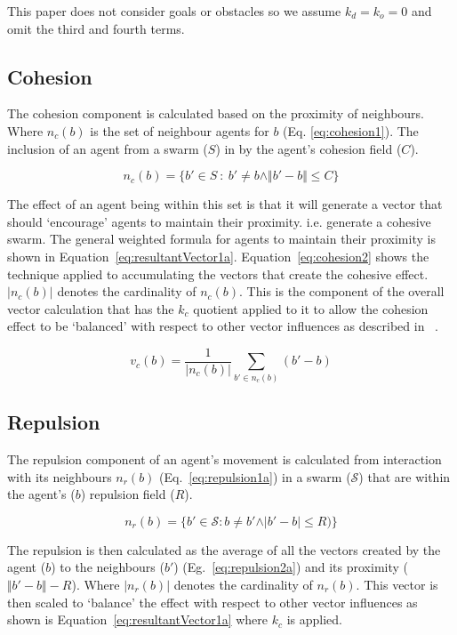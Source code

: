 \documentclass[12pt,a4paper]{IEEEtran}
\newcommand{\magn}[1]{\Vert{#1}\Vert}
\newcommand{\card}[1]{\vert{#1}\vert}
\newcommand{\vbb}[2]{#2-#1}
\newcommand{\kc}{\mathit{k_{c}}}
\newcommand{\kd}{\mathit{k_{d}}}
\newcommand{\ko}{\mathit{k_{o}}}
\newcommand{\rb}{\mathit{R}}
\begin{document}
This paper does not consider goals or obstacles so we assume $\kd = \ko = 0$ and omit the third and fourth terms.

\subsection{Cohesion}\label{cohesion}
The cohesion component is calculated based on the proximity of neighbours. Where $n_c(b)$ is the set of neighbour agents for $b$ (Eq. \ref{eq:cohesion1}). The inclusion of an agent from a swarm ($S$) in by the agent's cohesion field ($C$).

\begin{equation}\label{eq:cohesion1}
n_c(b) = \{b' \in S~:~b' \neq b \land\magn{\vbb{b}{b'}} \leq C\}
\end{equation}

The effect of an agent being within this set is that it will generate a vector that should `encourage' agents to maintain their proximity. i.e. generate a cohesive swarm. The general weighted formula for agents to maintain their proximity is shown in Equation~\ref{eq:resultantVector1a}. Equation~\ref{eq:cohesion2} shows the technique applied to accumulating the vectors that create the cohesive effect. $\card{n_c(b)}$ denotes the cardinality of $n_c(b)$. This is the component of the overall vector calculation that has the $\kc$ quotient applied to it to allow the cohesion effect to be `balanced' with respect to other vector influences as described in ~\cite{eliot2017methods,eliot2018metric,eliot2019void}. 

\begin{equation}\label{eq:cohesion2}
v_c(b) = \frac{1}{\card{n_c(b)}} \sum_{b' \in n_c(b)}(\vbb{b}{b'})
\end{equation}

\subsection{Repulsion}\label{repulsion:neighbours}
The repulsion component of an agent's movement is calculated from interaction with its neighbours $n_r(b)$ (Eq.~\ref{eq:repulsion1a}) in a swarm ($\mathcal{S}$) that are within the agent's ($b$) repulsion field ($\rb$).

\begin{equation}\label{eq:repulsion1a}
n_r(b) = \{b' \in \mathcal{S} : b \neq b' \land \card{\vbb{b}{b'}} \leq \rb)\}
\end{equation}

The repulsion is then calculated as the average of all the vectors created by the agent ($b$) to the neighbours ($b'$) (Eg.~\ref{eq:repulsion2a}) and its proximity ($\magn{\vbb{b}{b'}} - \rb$). Where $\card{n_r(b)}$ denotes the cardinality of $n_r(b)$. This vector is then scaled to `balance' the effect with respect to other vector influences as shown is Equation~\ref{eq:resultantVector1a} where $\kc$ is applied.
\end{document}
